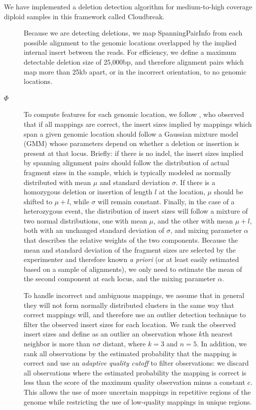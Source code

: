 \documentclass[11pt]{article}
\begin{document}
We have implemented a deletion detection algorithm for medium-to-high coverage diploid samples in this framework called Cloudbreak. 
\begin{description}
\item[] Because we are detecting deletions, we map SpanningPairInfo from each possible alignment to the genomic locations overlapped by the implied internal insert between the reads. For efficiency, we define a maximum detectable deletion size of 25,000bp, and therefore alignment pairs which map more than 25kb apart, or in the incorrect orientation, to no genomic locations.
\item[$\Phi$] To compute features for each genomic location, we follow \textcite{Lee:2009da}, who observed that if all mappings are correct, the insert sizes implied by mappings which span a given genomic location should follow a Gaussian mixture model (GMM) whose parameters depend on whether a deletion or insertion is present at that locus. Briefly: if there is no indel, the insert sizes implied by spanning alignment pairs should follow the distribution of actual fragment sizes in the sample, which is typically modeled as normally distributed with mean $\mu$ and standard deviation $\sigma$. If there is a homozygous deletion or insertion of length $l$ at the location, $\mu$ should be shifted to $\mu + l$, while $\sigma$ will remain constant. Finally, in the case of a heterozygous event, the distribution of insert sizes will follow a mixture of two normal distributions, one with mean $\mu$, and the other with mean $\mu + l$, both with an unchanged standard deviation of $\sigma$, and mixing parameter $\alpha$ that describes the relative weights of the two components. Because the mean and standard deviation of the fragment sizes are selected by the experimenter and therefore known \emph{a priori} (or at least easily estimated based on a sample of alignments), we only need to estimate the mean of the second component at each locus, and the mixing parameter $\alpha$.

To handle incorrect and ambiguous mappings, we assume that in general they will not form normally distributed clusters in the same way that correct mappings will, and therefore use an outlier detection technique to filter the observed insert sizes for each location. We rank the observed insert sizes and define as an outlier an observation whose $k$th nearest neighbor is more than $n\sigma$ distant, where $k = 3$ and $n = 5$. In addition, we rank all observations by the estimated probability that the mapping is correct and use an \emph{adaptive quality cutoff} to filter observations: we discard all observations where the estimated probability the mapping is correct is less than the score of the maximum quality observation minus a constant $c$. This allows the use of more uncertain mappings in repetitive regions of the genome while restricting the use of low-quality mappings in unique regions.


\end{description}
\end{document}

